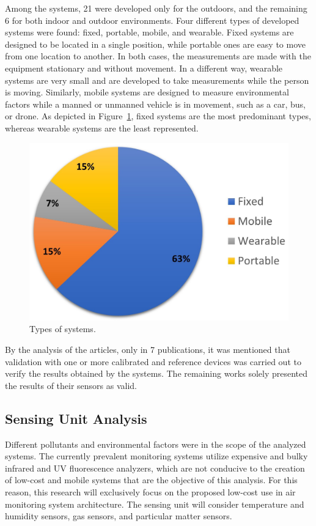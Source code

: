 \documentclass[10pt]{../imeko_acta}
\begin{document}
Among the systems, 21 were developed only for the outdoors, and the remaining 6 for both indoor and outdoor environments. Four different types of developed systems were found: fixed, portable, mobile, and wearable. Fixed systems are designed to be located in a single position, while portable ones are easy to move from one location to another. In both cases, the measurements are made with the equipment stationary and without movement. In a different way, wearable systems are very small and are developed to take measurements while the person is moving. Similarly, mobile systems are designed to measure environmental factors while a manned or unmanned vehicle is in movement, such as a car, bus, or drone. 
 As depicted in Figure~\ref{type_systems}, fixed systems are the most predominant types, whereas wearable systems are the least represented.

 \begin{figure}[!tb]
	\centering
	\includegraphics[width=0.7\linewidth]{type_of_system.jpg}
	\caption{Types of systems.
        \label{type_systems}}
\end{figure}

By the analysis of the articles, only in 7 publications, it was mentioned that validation with one or more calibrated and reference devices was carried out to verify the results obtained by the systems. The remaining works solely  presented the results of their sensors as valid.

\subsection{Sensing Unit Analysis}\label{SUA}

Different pollutants and environmental factors were in the scope of the analyzed systems. The currently prevalent monitoring systems utilize expensive and bulky infrared and UV fluorescence analyzers, which are not conducive to the creation of low-cost and mobile systems that are the objective of this analysis. For this reason, this research will exclusively focus on the proposed low-cost use in air monitoring system architecture. The sensing unit will consider temperature and humidity sensors, gas sensors, and particular matter sensors. 
\end{document}
